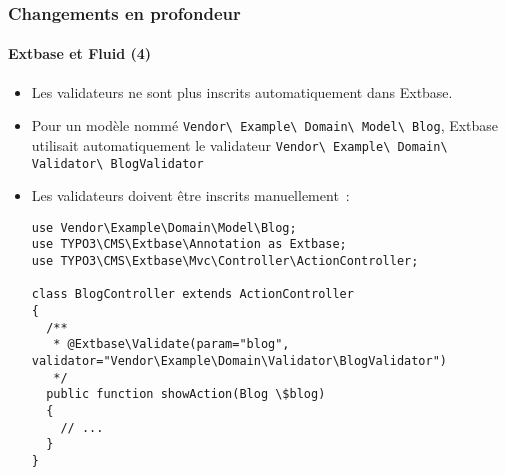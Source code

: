 \begin{frame}[fragile]
	\frametitle{Changements en profondeur}
	\framesubtitle{Extbase et Fluid (4)}

	\lstset{basicstyle=\tiny\ttfamily}

	\begin{itemize}
		\item Les validateurs ne sont plus inscrits automatiquement dans Extbase.
		\item Pour un modèle nommé
			\small\texttt{Vendor\textbackslash
				Example\textbackslash
				Domain\textbackslash
				Model\textbackslash
				Blog}\normalsize,\newline
			Extbase utilisait automatiquement le validateur
			\small\texttt{Vendor\textbackslash
				Example\textbackslash
				Domain\textbackslash
				Validator\textbackslash
				BlogValidator}\normalsize

		\item Les validateurs doivent être inscrits manuellement~:
\begin{lstlisting}
use Vendor\Example\Domain\Model\Blog;
use TYPO3\CMS\Extbase\Annotation as Extbase;
use TYPO3\CMS\Extbase\Mvc\Controller\ActionController;

class BlogController extends ActionController
{
  /**
   * @Extbase\Validate(param="blog", validator="Vendor\Example\Domain\Validator\BlogValidator")
   */
  public function showAction(Blog \$blog)
  {
    // ...
  }
}
\end{lstlisting}

	\end{itemize}

\end{frame}


